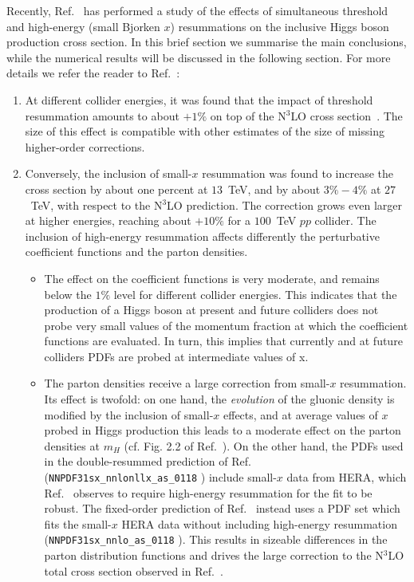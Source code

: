 Recently, Ref.~\cite{Bonvini:2018ixe} has performed a study of the
effects of simultaneous threshold and high-energy (small Bjorken $x$)
resummations on the inclusive Higgs boson production cross section. In this brief
section we summarise the main conclusions, while the numerical results
will be discussed in the following section. For more details we refer
the reader to Ref.~\cite{Bonvini:2018ixe}:
\begin{enumerate}
\item At different collider energies, it was found that the impact of
  threshold resummation amounts to about $+1\%$ on top of the N$^3$LO
  cross section~\cite{Bonvini:2016frm}. The size of this effect is
  compatible with other estimates of the size of missing higher-order
  corrections.
\item Conversely, the inclusion of small-$x$ resummation was found to
  increase the cross section by about one percent at $13$~TeV, and by
  about $3\%-4\%$ at $27$~TeV, with respect to the N$^3$LO
  prediction. The correction grows even larger at higher 
  energies, reaching about $+10\%$ for a $100$~TeV $pp$ collider. The
  inclusion of high-energy resummation affects differently the
  perturbative coefficient functions and the parton densities.
\begin{itemize}
\item The effect on the coefficient functions is very moderate, and
  remains below the $1\%$ level for different collider energies. This
  indicates that the production of a Higgs boson at present and future
  colliders does not probe very small values of the momentum fraction
  at which the coefficient functions are evaluated.
  In turn, this implies that currently and at future colliders PDFs are probed at intermediate values of x.

\item The parton densities receive a large correction from small-$x$
  resummation. Its effect is twofold: on one hand, the {\it evolution}
  of the gluonic density is modified by the inclusion of small-$x$
  effects, and at average values of $x$ probed in Higgs production
  this leads to a moderate effect on the parton densities at $m_H$
  (cf. Fig. 2.2 of Ref.~\cite{Ball:2017otu}). On the other hand, the
  PDFs used in the double-resummed prediction of
  Ref.~\cite{Bonvini:2018ixe} (\verb+NNPDF31sx_nnlonllx_as_0118+
  \cite{Ball:2017otu}) include small-$x$ data from HERA, which
  Ref.~\cite{Ball:2017otu} observes to require high-energy resummation
  for the fit to be robust. The fixed-order prediction of
  Ref.~\cite{Bonvini:2018ixe} instead uses a PDF set which fits the
  small-$x$ HERA data without including high-energy resummation
  (\verb+NNPDF31sx_nnlo_as_0118+ \cite{Ball:2017otu}).  This results
  in sizeable differences in the parton distribution functions and
  drives the large correction to the N$^3$LO total cross section
  observed in Ref.~\cite{Bonvini:2018ixe}.
\end{itemize}
\end{enumerate}
